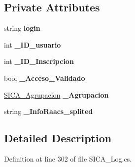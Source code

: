 \subsection*{Private Attributes}
\begin{DoxyCompactItemize}
\item 
string {\bfseries login}\hypertarget{class_sica_segura_1_1_s_i_c_a___libro_control_af9645429ebfabbe111e04c15a5b89b34}{}\label{class_sica_segura_1_1_s_i_c_a___libro_control_af9645429ebfabbe111e04c15a5b89b34}

\item 
int {\bfseries \+\_\+\+I\+D\+\_\+usuario}\hypertarget{class_sica_segura_1_1_s_i_c_a___libro_control_ae3c083b0d7e47c5c635f028722954544}{}\label{class_sica_segura_1_1_s_i_c_a___libro_control_ae3c083b0d7e47c5c635f028722954544}

\item 
int {\bfseries \+\_\+\+I\+D\+\_\+\+Inscripcion}\hypertarget{class_sica_segura_1_1_s_i_c_a___libro_control_a47f45eb36dab4732f7acf1ac6dedd160}{}\label{class_sica_segura_1_1_s_i_c_a___libro_control_a47f45eb36dab4732f7acf1ac6dedd160}

\item 
bool {\bfseries \+\_\+\+Acceso\+\_\+\+Validado}\hypertarget{class_sica_segura_1_1_s_i_c_a___libro_control_a0315d9f7f35d5e387afeed71c75a1462}{}\label{class_sica_segura_1_1_s_i_c_a___libro_control_a0315d9f7f35d5e387afeed71c75a1462}

\item 
\hyperlink{class_sica_segura_1_1_s_i_c_a___agrupacion}{S\+I\+C\+A\+\_\+\+Agrupacion} {\bfseries \+\_\+\+Agrupacion}\hypertarget{class_sica_segura_1_1_s_i_c_a___libro_control_a9412b76f51541edb4e117f00d4dc729f}{}\label{class_sica_segura_1_1_s_i_c_a___libro_control_a9412b76f51541edb4e117f00d4dc729f}

\item 
string {\bfseries \+\_\+\+Info\+Raacs\+\_\+splited}\hypertarget{class_sica_segura_1_1_s_i_c_a___libro_control_ac569866649fe77e5b6c87c7d3435ead5}{}\label{class_sica_segura_1_1_s_i_c_a___libro_control_ac569866649fe77e5b6c87c7d3435ead5}

\end{DoxyCompactItemize}


\subsection{Detailed Description}


Definition at line 302 of file S\+I\+C\+A\+\_\+\+Log.\+cs.



